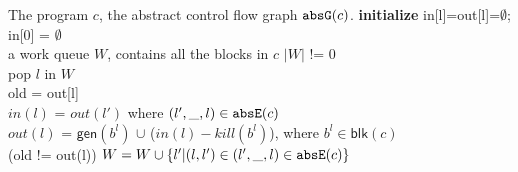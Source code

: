 \begin{enumerate}
\begin{algorithm}
\begin{algorithmic}[1]
 \REQUIRE The program $c$, the abstract control flow graph $\mathtt{abs}{\mathtt{G}}(c)$.
 \STATE \textbf{initialize} in[l]=out[l]=$\emptyset$; in[0] = $\emptyset$
 \\
 a work queue $W$, contains all the blocks in $c$
  $|W|$ != 0 \\
 \STATE \qquad pop $l$ in $W$ \\
 \STATE \qquad old = out[l] \\
 \STATE \qquad $in(l)$ = $out(l')$ where $(l',\_, l) \in \mathtt{abs}{\mathtt{E}}(c)$\\
 \STATE \qquad $out(l)$ = $\mathsf{gen}(b^l)$ $\cup$ ($in(l) - kill(b^l)$), where $b^l \in \mathsf{blk}(c)$ \\
 \STATE {} (old != out(l)) $W = W \cup \{l'| (l,l') \in (l',\_, l) \in \mathtt{abs}{\mathtt{E}}(c)\}$ 
 \end{algorithmic}
 \end{algorithm}
\end{enumerate}
%
